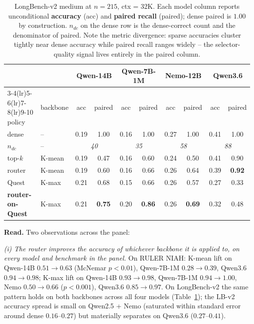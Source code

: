 \documentclass[11pt]{article}
\theoremstyle{remark}
\begin{document}
\begin{table}[h]
\centering\small
\caption{LongBench-v2 medium at $n=215$, ctx = 32K. Each model column reports unconditional \textbf{accuracy} (acc) and \textbf{paired recall} (paired); dense paired is $1.00$ by construction. $n_{dc}$ on the dense row is the dense-correct count and the denominator of paired. Note the metric divergence: sparse accuracies cluster tightly near dense accuracy while paired recall ranges widely -- the selector-quality signal lives entirely in the paired column.}\label{tab:lbv2}
\begin{tabular}{llcccccccc}
\toprule
 & & \multicolumn{2}{c}{Qwen-14B} & \multicolumn{2}{c}{Qwen-7B-1M} & \multicolumn{2}{c}{Nemo-12B} & \multicolumn{2}{c}{Qwen3.6} \\
\cmidrule(lr){3-4}\cmidrule(lr){5-6}\cmidrule(lr){7-8}\cmidrule(lr){9-10}
policy & backbone & acc & paired & acc & paired & acc & paired & acc & paired \\
\midrule
dense                    & --      & 0.19 & 1.00 & 0.16 & 1.00 & 0.27 & 1.00 & 0.41 & 1.00 \\
\emph{$n_{dc}$}          & --      & \multicolumn{2}{c}{\emph{40}} & \multicolumn{2}{c}{\emph{35}} & \multicolumn{2}{c}{\emph{58}} & \multicolumn{2}{c}{\emph{88}} \\
\midrule
top-$k$                  & K-mean  & 0.19 & 0.47 & 0.16 & 0.60 & 0.24 & 0.50 & 0.41 & 0.90 \\
router                   & K-mean  & 0.19 & 0.60 & 0.16 & 0.66 & 0.26 & 0.64 & 0.39 & \textbf{0.92} \\
Quest                    & K-max   & 0.21 & 0.68 & 0.15 & 0.66 & 0.26 & 0.57 & 0.27 & 0.33 \\
\textbf{router-on-Quest} & K-max   & 0.21 & \textbf{0.75} & 0.20 & \textbf{0.86} & 0.26 & \textbf{0.69} & 0.32 & 0.48 \\
\bottomrule
\end{tabular}
\end{table}

\textbf{Read.} Two observations across the panel:

\emph{(i) The router improves the accuracy of whichever backbone it is applied to, on every model and benchmark in the panel.} On RULER NIAH: K-mean lift on Qwen-14B $0.51 \to 0.63$ (McNemar $p<0.01$), Qwen-7B-1M $0.28 \to 0.39$, Qwen3.6 $0.94 \to 0.98$; K-max lift on Qwen-14B $0.93 \to 0.98$, Qwen-7B-1M $0.94 \to 1.00$, Nemo $0.50 \to 0.66$ ($p<0.001$), Qwen3.6 $0.85 \to 0.97$. On LongBench-v2 the same pattern holds on both backbones across all four models (Table~\ref{tab:lbv2}); the LB-v2 accuracy spread is small on Qwen2.5 + Nemo (saturated within standard error around dense $0.16$--$0.27$) but materially separates on Qwen3.6 ($0.27$--$0.41$).
\end{document}
